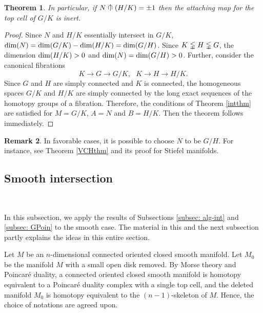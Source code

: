 \documentclass[a4]{amsart}
\newtheorem{theorem}{Theorem}[section]
\theoremstyle{definition}
\newtheorem{remark}[theorem]{Remark}
\newcommand{\testcap}{\mathrel{\vcenter{\offinterlineskip
\hbox{$\cap$}\vskip-1.8ex\hbox{$\kern0.2em | \kern0.15em$}}}}
\begin{document}
\begin{sloppypar}
\begin{theorem}
In particular, if $N\testcap (H/K)=\pm 1$ then the attaching map for the top cell of $G/K$ is inert. 
\end{theorem}
\begin{proof}
Since $N$ and $H/K$ essentially intersect in $G/K$, ${\rm dim}(N)={\rm dim}(G/K)-{\rm dim}(H/K)={\rm dim}(G/H)$. Since $K\lvertneqq H\lvertneqq G$, the dimension ${\rm dim}(H/K)>0$ and ${\rm dim}(N)={\rm dim}(G/H)>0$. 
Further, consider the canonical fibrations 
\[
K\stackrel{}{\longrightarrow} G\stackrel{}{\longrightarrow} G/K, \ \ \ 
K\stackrel{}{\longrightarrow} H\stackrel{}{\longrightarrow} H/K.
\]
Since $G$ and $H$ are simply connected and $K$ is connected, the homogeneous spaces $G/K$ and $H/K$ are simply connected by the long exact sequences of the homotopy groups of a fibration. 
Therefore, the conditions of Theorem \ref{intthm} are satisfied for $M=G/K$, $A=N$ and $B=H/K$. Then the theorem follows immediately. 
\end{proof}

\begin{remark}\label{tophom-rmk}
In favorable cases, it is possible to choose $N$ to be $G/H$. For instance, see Theorem \ref{VCHthm} and its proof for Stiefel manifolds. 
\end{remark}
\subsection{Smooth intersection}
\label{subsec: geo-int}

$\, $

In this subsection, we apply the results of Subsections \ref{subsec: alg-int} and \ref{subsec: GPoin} to the smooth case. The material in this and the next subsection partly explains the ideas in this entire section. 

Let $M$ be an $n$-dimensional connected oriented closed smooth manifold. 
Let $M_0$ be the manifold $M$ with a small open disk removed. By Morse theory and Poincar\'{e} duality, a connected oriented closed smooth manifold is homotopy equivalent to a Poincar\'{e} duality complex with a single top cell, and the deleted manifold $M_0$ is homotopy equivalent to the $(n-1)$-skeleton of $M$. Hence, the choice of notations are agreed upon.  


\end{sloppypar}
\end{document}
